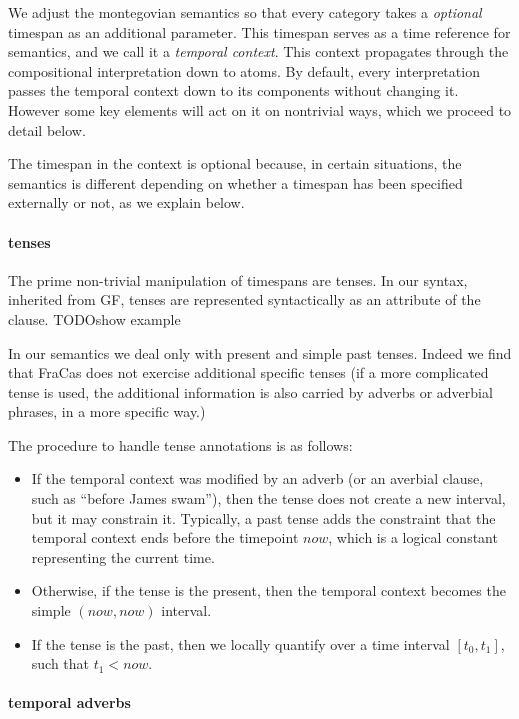 \documentclass[a4paper,11pt]{article}
\begin{document}
We adjust the montegovian semantics so that every category takes a
\emph{optional} timespan as an additional parameter. This timespan
serves as a time reference for semantics, and we call it a
\emph{temporal context}. This context propagates through the
compositional interpretation down to atoms. By default, every
interpretation passes the temporal context down to its components
without changing it. However some key elements will act on it on
nontrivial ways, which we proceed to detail below.

The timespan in the context is optional because, in certain
situations, the semantics is different depending on whether a timespan
has been specified externally or not, as we explain below.

\paragraph{tenses}

The prime non-trivial manipulation of timespans are tenses. In our
syntax, inherited from GF, tenses are represented syntactically as an
attribute of the clause. TODO{show example}

In our semantics we deal only with present and simple past
tenses.  Indeed we find that FraCas does not exercise additional
specific tenses (if a more complicated tense is used, the additional
information is also carried by adverbs or adverbial phrases, in a more
specific way.)

The procedure to handle tense annotations is as follows:
\begin{itemize}
\item If the temporal context was modified by an adverb (or an
  averbial clause, such as ``before James swam''), then the tense does
  not create a new interval, but it may constrain it. Typically, a
  past tense adds the constraint that the temporal context ends before
  the timepoint $now$, which is a logical constant representing the current
  time.
\item Otherwise, if the tense is the present, then the temporal
  context becomes the simple $(now,now)$ interval.
\item
  If the tense is the past, then we locally quantify over a time
  interval $[t_0,t_1]$, such that $t_1 < now$.
\end{itemize}

\paragraph{temporal adverbs}
\end{document}
